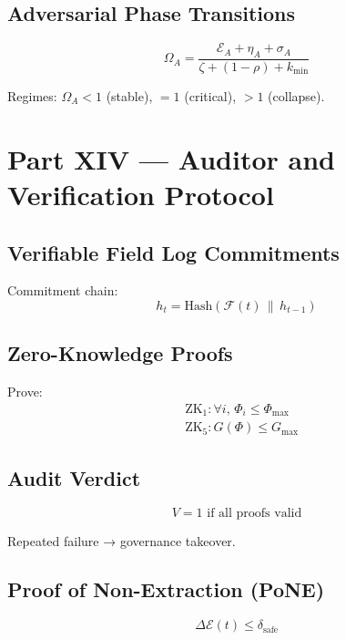 \documentclass[11pt,a4paper]{article}
\theoremstyle{plain}
\theoremstyle{definition}
\theoremstyle{remark}
\begin{document}
\subsection{Adversarial Phase Transitions}

\[
\Omega_A = \frac{\mathcal{E}_A + \eta_A + \sigma_A}{\zeta + (1-\rho) + k_{\min}}
\]

Regimes: $\Omega_A < 1$ (stable), $=1$ (critical), $>1$ (collapse).

\newpage

\section*{Part XIV — Auditor and Verification Protocol}

\subsection{Verifiable Field Log Commitments}

Commitment chain:
\[
h_t = \text{Hash}(\mathcal{F}(t) \,\|\, h_{t-1})
\]

\subsection{Zero-Knowledge Proofs}

Prove:
\begin{align}
&\text{ZK}_1: \forall i,\, \Phi_i \le \Phi_{\max} \\
&\text{ZK}_5: G(\Phi) \le G_{\max}
\end{align}

\subsection{Audit Verdict}

\[
V = 1 \text{ if all proofs valid}
\]

Repeated failure → governance takeover.

\subsection{Proof of Non-Extraction (PoNE)}

\[
\Delta \mathcal{E}(t) \le \delta_{\text{safe}}
\]
\end{document}
